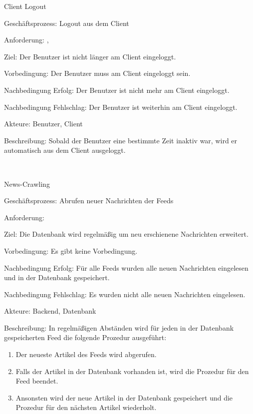 \begin{function}{31}{Client Logout}
\item[Geschäftsprozess:] Logout aus dem Client
\item[Anforderung:] , 
\item[Ziel:] Der Benutzer ist nicht länger am Client eingeloggt.
\item[Vorbedingung:] Der Benutzer muss am Client eingeloggt sein.
\item[Nachbedingung Erfolg:] Der Benutzer ist nicht mehr am Client eingeloggt.
\item[Nachbedingung Fehlschlag:] Der Benutzer ist weiterhin am Client eingeloggt.
\item[Akteure:] Benutzer, Client
\item[Beschreibung:] Sobald der Benutzer eine bestimmte Zeit inaktiv war, wird er automatisch aus dem Client ausgeloggt.
\end{function} ~

\begin{function}{40}{News-Crawling}
\item[Geschäftsprozess:] Abrufen neuer Nachrichten der Feeds
\item[Anforderung:] 
\item[Ziel:] Die Datenbank wird regelmäßig um neu erschienene Nachrichten erweitert.
\item[Vorbedingung:] Es gibt keine Vorbedingung.
\item[Nachbedingung Erfolg:] Für alle Feeds wurden alle neuen Nachrichten eingelesen und in der Datenbank gespeichert.
\item[Nachbedingung Fehlschlag:] Es wurden nicht alle neuen Nachrichten eingelesen.
\item[Akteure:] Backend, Datenbank
\item[Beschreibung:] In regelmäßigen Abständen wird für jeden in der Datenbank gespeicherten Feed die folgende Prozedur ausgeführt:
\begin{enumerate}
\item Der neueste Artikel des Feeds wird abgerufen.
\item Falls der Artikel in der Datenbank vorhanden ist, wird die Prozedur für den Feed beendet.
\item Ansonsten wird der neue Artikel in der Datenbank gespeichert und die Prozedur für den nächsten Artikel wiederholt.
\end{enumerate}
\end{function} ~

